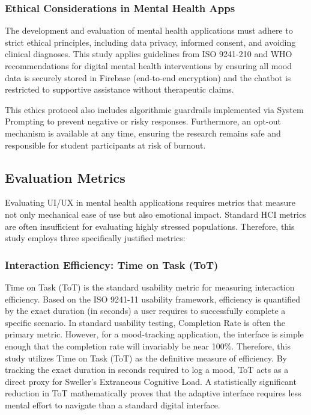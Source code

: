 \subsubsection{Ethical Considerations in Mental Health Apps}

The development and evaluation of mental health applications must adhere to strict ethical principles, including data privacy, informed consent, and avoiding clinical diagnoses. This study applies guidelines from ISO 9241-210 and WHO recommendations for digital mental health interventions by ensuring all mood data is securely stored in Firebase (end-to-end encryption) and the chatbot is restricted to supportive assistance without therapeutic claims.

This ethics protocol also includes algorithmic guardrails implemented via System Prompting to prevent negative or risky responses. Furthermore, an opt-out mechanism is available at any time, ensuring the research remains safe and responsible for student participants at risk of burnout.

\subsection{Evaluation Metrics}

Evaluating UI/UX in mental health applications requires metrics that measure not only mechanical ease of use but also emotional impact. Standard HCI metrics are often insufficient for evaluating highly stressed populations. Therefore, this study employs three specifically justified metrics:

\subsubsection{Interaction Efficiency: Time on Task (ToT)}

Time on Task (ToT) is the standard usability metric for measuring interaction efficiency. Based on the ISO 9241-11 usability framework, efficiency is quantified by the exact duration (in seconds) a user requires to successfully complete a specific scenario. In standard usability testing, Completion Rate is often the primary metric. However, for a mood-tracking application, the interface is simple enough that the completion rate will invariably be near 100\%. Therefore, this study utilizes Time on Task (ToT) as the definitive measure of efficiency. By tracking the exact duration in seconds required to log a mood, ToT acts as a direct proxy for Sweller's Extraneous Cognitive Load. A statistically significant reduction in ToT mathematically proves that the adaptive interface requires less mental effort to navigate than a standard digital interface.

